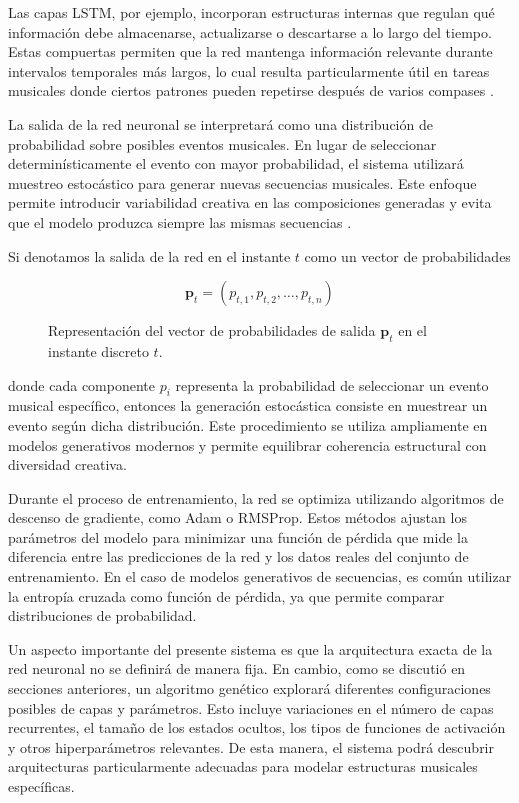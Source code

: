 \documentclass[12pt]{report}
\begin{document}
Las capas LSTM, por ejemplo, incorporan estructuras internas que regulan qué información debe almacenarse, actualizarse o descartarse a lo largo del tiempo. Estas compuertas permiten que la red mantenga información relevante durante intervalos temporales más largos, lo cual resulta particularmente útil en tareas musicales donde ciertos patrones pueden repetirse después de varios compases \cite{eck2002finding}.

La salida de la red neuronal se interpretará como una distribución de probabilidad sobre posibles eventos musicales. En lugar de seleccionar determinísticamente el evento con mayor probabilidad, el sistema utilizará muestreo estocástico para generar nuevas secuencias musicales. Este enfoque permite introducir variabilidad creativa en las composiciones generadas y evita que el modelo produzca siempre las mismas secuencias \cite{holtzman2019curious}.

Si denotamos la salida de la red en el instante $t$ como un vector de probabilidades


\begin{figure}[htbp]
    \centering
    \begin{equation}
        \mathbf{p}_t = (p_{t,1}, p_{t,2}, \dots, p_{t,n})
        \label{eq:vector_probabilidades}
    \end{equation}
    \caption{Representación del vector de probabilidades de salida $\mathbf{p}_t$ en el instante discreto $t$.}
\end{figure}

donde cada componente $p_i$ representa la probabilidad de seleccionar un evento musical específico, entonces la generación estocástica consiste en muestrear un evento según dicha distribución. Este procedimiento se utiliza ampliamente en modelos generativos modernos y permite equilibrar coherencia estructural con diversidad creativa.

Durante el proceso de entrenamiento, la red se optimiza utilizando algoritmos de descenso de gradiente, como Adam \cite{kingma2014adam} o RMSProp. Estos métodos ajustan los parámetros del modelo para minimizar una función de pérdida que mide la diferencia entre las predicciones de la red y los datos reales del conjunto de entrenamiento. En el caso de modelos generativos de secuencias, es común utilizar la entropía cruzada como función de pérdida, ya que permite comparar distribuciones de probabilidad.

Un aspecto importante del presente sistema es que la arquitectura exacta de la red neuronal no se definirá de manera fija. En cambio, como se discutió en secciones anteriores, un algoritmo genético \cite{stanley2002evolving} explorará diferentes configuraciones posibles de capas y parámetros. Esto incluye variaciones en el número de capas recurrentes, el tamaño de los estados ocultos, los tipos de funciones de activación y otros hiperparámetros relevantes. De esta manera, el sistema podrá descubrir arquitecturas particularmente adecuadas para modelar estructuras musicales específicas.
\end{document}
